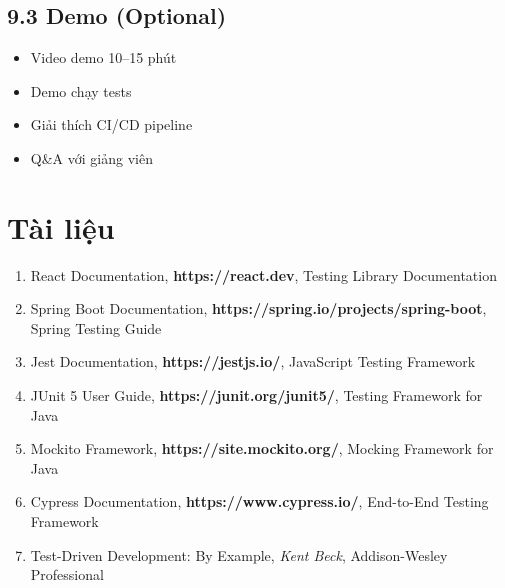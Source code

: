\documentclass[a4paper,12pt]{article}
\begin{document}
\subsection{9.3 Demo (Optional)}

\begin{itemize}
    \item Video demo 10–15 phút
    \item Demo chạy tests
    \item Giải thích CI/CD pipeline
    \item Q\&A với giảng viên
\end{itemize}

\section*{Tài liệu}

\begin{enumerate}
    \item React Documentation, \textbf{https://react.dev}, Testing Library Documentation
    \item Spring Boot Documentation, \textbf{https://spring.io/projects/spring-boot}, Spring Testing Guide
    \item Jest Documentation, \textbf{https://jestjs.io/}, JavaScript Testing Framework
    \item JUnit 5 User Guide, \textbf{https://junit.org/junit5/}, Testing Framework for Java
    \item Mockito Framework, \textbf{https://site.mockito.org/}, Mocking Framework for Java
    \item Cypress Documentation, \textbf{https://www.cypress.io/}, End-to-End Testing Framework
    \item Test-Driven Development: By Example, \textit{Kent Beck}, Addison-Wesley Professional
\end{enumerate}
\end{document}
